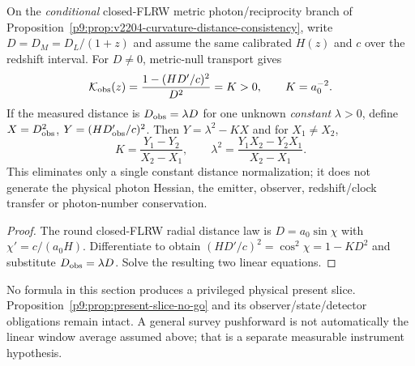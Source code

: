\documentclass[12pt,a4paper]{article}
\begin{document}
\begin{proposition}
\label{p9:prop:v358-optical-two-redshift}
On the \emph{conditional} closed-FLRW metric photon/reciprocity branch
of Proposition~\ref{p9:prop:v2204-curvature-distance-consistency},
write $D=D_M=D_L/(1+z)$ and assume the same calibrated $H(z)$ and
$c$ over the redshift interval.  For $D\ne0$, metric-null transport
gives
\[
 \mathcal K_{\rm obs}(z)=
 \frac{1-(HD'/c)^2}{D^2}=K>0,
 \qquad K=a_0^{-2}.
\]
If the measured distance is $D_{\rm obs}=\lambda D$ for one
unknown \emph{constant} $\lambda>0$, define
$X=D_{\rm obs}^2$, $Y=(HD_{\rm obs}'/c)^2$.
Then $Y=\lambda^2-KX$ and for $X_1\ne X_2$,
\begin{equation}
\label{p9:eq:v358-optical-calibration}
 K=\frac{Y_1-Y_2}{X_2-X_1},\qquad
 \lambda^2=\frac{Y_1X_2-Y_2X_1}{X_2-X_1}.
\end{equation}
This eliminates only a single constant distance normalization;
it does not generate the physical photon Hessian, the emitter,
observer, redshift/clock transfer or photon-number conservation.
\end{proposition}
\begin{proof}
The round closed-FLRW radial distance law is
$D=a_0\sin\chi$ with $\chi' =c/(a_0H)$.  Differentiate to
obtain $(HD'/c)^2=\cos^2\chi=1-KD^2$ and substitute
$D_{\rm obs}=\lambda D$.  Solve the resulting two linear equations.
\end{proof}

\begin{remark}
\label{p9:rem:v358-no-present-preserved}
No formula in this section produces a privileged physical present
slice.  Proposition~\ref{p9:prop:present-slice-no-go} and its
observer/state/detector obligations remain intact.  A general
survey pushforward is not automatically the linear window average
assumed above; that is a separate measurable instrument hypothesis.
\end{remark}


\end{document}
